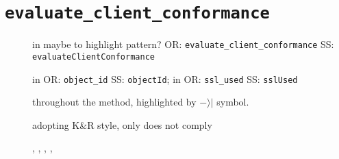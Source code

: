 \clearpage
\section{\normalfont\texttt{evaluate\_client\_conformance}}

\begin{description}
	\item [] 
		in  maybe to highlight pattern? 
			OR: \texttt{evaluate\_client\_conformance}
			SS: \texttt{evaluateClientConformance}
	\item [] 
		in  
			OR: \texttt{object\_id}
			SS: \texttt{objectId}; 
		in  
			OR: \texttt{ssl\_used}
			SS: \texttt{sslUsed}
	\item []
		throughout the method, highlighted by $-\rangle|$ symbol. %
	\item []
		adopting K\&R style, only  does not comply
	\item [] , , , , 

\end{description}















